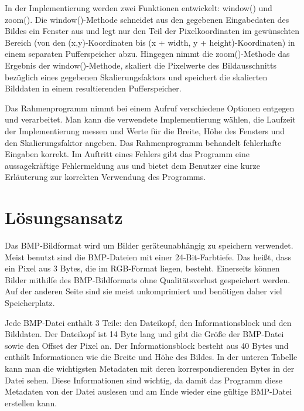 \documentclass[course=erap]{aspdoc}
\begin{document}
    In der Implementierung werden zwei Funktionen entwickelt: window() und zoom().
    Die window()-Methode schneidet aus den gegebenen Eingabedaten des Bildes ein Fenster aus
    und legt nur den Teil der Pixelkoordinaten im gewünschten Bereich (von den (x,y)-Koordinaten
    bis (x + width, y + height)-Koordinaten) in einem separaten Pufferspeicher abzu.
    Hingegen nimmt die zoom()-Methode das Ergebnis der window()-Methode, skaliert die Pixelwerte
    des Bildausschnitts bezüglich eines gegebenen Skalierungsfaktors und speichert die
    skalierten Bilddaten in einem resultierenden Pufferspeicher.

    Das Rahmenprogramm nimmt bei einem Aufruf verschiedene Optionen entgegen und verarbeitet.
    Man kann die verwendete Implementierung wählen, die Laufzeit der Implementierung messen
    und Werte für die Breite, Höhe des Fensters und den Skalierungsfaktor angeben.
    Das Rahmenprogramm behandelt fehlerhafte Eingaben korrekt.
    Im Auftritt eines Fehlers gibt das Programm eine aussagekräftige Fehlermeldung aus
    und bietet dem Benutzer eine kurze Erläuterung zur korrekten Verwendung des Programms.

    \section{Lösungsansatz}

    Das BMP-Bildformat wird um Bilder geräteunabhängig zu speichern verwendet.
    Meist benutzt sind die BMP-Dateien mit einer 24-Bit-Farbtiefe.
    Das heißt, dass ein Pixel aus 3 Bytes, die im RGB-Format liegen, besteht.
    Einerseits können Bilder mithilfe des BMP-Bildformats ohne Qualitätsverlust gespeichert werden.
    Auf der anderen Seite sind sie meist unkomprimiert und benötigen daher viel Speicherplatz.

    Jede BMP-Datei enthält 3 Teile: den Dateikopf, den Informationsblock und den Bilddaten. Der Dateikopf ist 14 Byte lang und gibt
    die Größe der BMP-Datei sowie den Offset der Pixel an. Der Informationsblock besteht aus 40 Bytes und enthält Informationen wie
    die Breite und Höhe des Bildes. In der unteren Tabelle kann man die wichtigsten Metadaten mit deren korrespondierenden Bytes
    in der Datei sehen. Diese Informationen sind wichtig, da damit das Programm diese Metadaten von der Datei auslesen und am Ende wieder
    eine gültige BMP-Datei erstellen kann.
\end{document}
